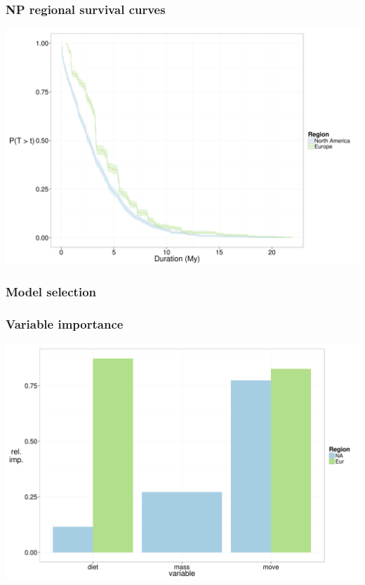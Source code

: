 \documentclass{beamer}
\begin{document}
\begin{frame}
  \frametitle{NP regional survival curves}

  \includegraphics[height=0.8\textheight,width=\textwidth,keepaspectratio=true]{figure/kms_region}

\end{frame}

\begin{frame}
  \frametitle{Model selection}

\end{frame}

\begin{frame}
  \frametitle{Variable importance}
  \includegraphics[height=0.8\textheight,width=\textwidth,keepaspectratio=true]{figure/rel_imp}

\end{frame}
\end{document}
